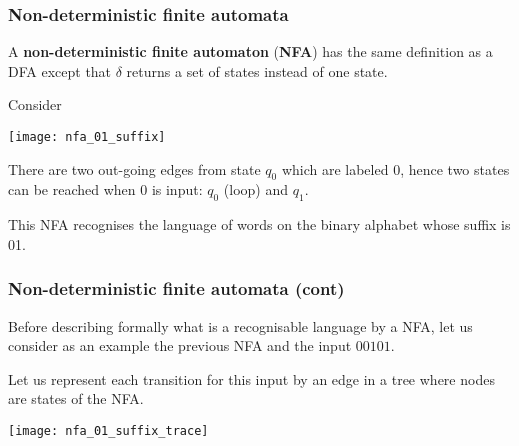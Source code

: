 
% 
\begin{frame}
\frametitle{Non-deterministic finite automata}

\label{nfa_01_suffix}

A \textbf{non-deterministic finite automaton} (\textbf{NFA}) has the
same definition as a DFA except that \(\delta\) returns a set of
states instead of one state.

\bigskip

Consider
\begin{center}
\texttt{[image: nfa\_01\_suffix]}
\end{center}
There are two out-going edges from state \(q_0\) which are labeled
\(0\), hence two states can be reached when \(0\) is input: \(q_0\)
(loop) and \(q_1\).

This NFA recognises the language of words on the binary alphabet whose
suffix is 01.

\end{frame}

% 
\begin{frame}
\frametitle{Non-deterministic finite automata (cont)}

Before describing formally what is a recognisable language by a NFA,
let us consider as an example the previous NFA and the input
\(00101\).

Let us represent each transition for this input by an edge in a tree
where nodes are states of the NFA.
\begin{center}
\texttt{[image: nfa\_01\_suffix\_trace]}
\end{center}

\end{frame}

